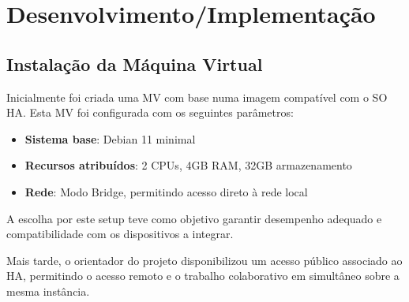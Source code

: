


\chapter{Desenvolvimento/Implementação}\label{cap:development}


\section{Instalação da Máquina Virtual}

Inicialmente foi criada uma \gls{MV} com base numa imagem compatível com o  \gls{SO} \gls{HA}. Esta \gls{MV} foi configurada com os seguintes parâmetros:

\begin{itemize}
    \item \textbf{Sistema base}: Debian 11 minimal
    \item \textbf{Recursos atribuídos}: 2 CPUs, 4GB RAM, 32GB armazenamento
    \item \textbf{Rede}: Modo Bridge, permitindo acesso direto à rede local
\end{itemize}

A escolha por este setup teve como objetivo garantir desempenho adequado e compatibilidade com os dispositivos a integrar.

Mais tarde, o orientador do projeto disponibilizou um acesso público associado ao \gls{HA}, permitindo o acesso remoto e o trabalho colaborativo em simultâneo sobre a mesma instância.



